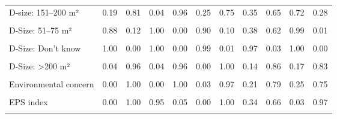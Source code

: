 \begin{table}
\begin{tabular}[t]{lrrrrrrrrrr}
D-size: 151–200 m² & 0.19 & 0.81 & 0.04 & 0.96 & 0.25 & 0.75 & 0.35 & 0.65 & 0.72 & 0.28\\
\cellcolor{gray!10}{D-Size: 26–50 m²} & \cellcolor{gray!10}{0.78} & \cellcolor{gray!10}{0.22} & \cellcolor{gray!10}{0.94} & \cellcolor{gray!10}{0.06} & \cellcolor{gray!10}{0.53} & \cellcolor{gray!10}{0.47} & \cellcolor{gray!10}{0.62} & \cellcolor{gray!10}{0.38} & \cellcolor{gray!10}{0.98} & \cellcolor{gray!10}{0.02}\\
D-Size: 51–75 m² & 0.88 & 0.12 & 1.00 & 0.00 & 0.90 & 0.10 & 0.38 & 0.62 & 0.99 & 0.01\\
\cellcolor{gray!10}{D-Size: 76–100 m²} & \cellcolor{gray!10}{0.99} & \cellcolor{gray!10}{0.01} & \cellcolor{gray!10}{0.93} & \cellcolor{gray!10}{0.07} & \cellcolor{gray!10}{0.90} & \cellcolor{gray!10}{0.10} & \cellcolor{gray!10}{0.52} & \cellcolor{gray!10}{0.48} & \cellcolor{gray!10}{0.93} & \cellcolor{gray!10}{0.07}\\
D-Size: Don't know & 1.00 & 0.00 & 1.00 & 0.00 & 0.99 & 0.01 & 0.97 & 0.03 & 1.00 & 0.00\\
\cellcolor{gray!10}{D-Size: <25 m²} & \cellcolor{gray!10}{0.96} & \cellcolor{gray!10}{0.04} & \cellcolor{gray!10}{1.00} & \cellcolor{gray!10}{0.00} & \cellcolor{gray!10}{0.94} & \cellcolor{gray!10}{0.06} & \cellcolor{gray!10}{0.20} & \cellcolor{gray!10}{0.80} & \cellcolor{gray!10}{0.92} & \cellcolor{gray!10}{0.08}\\
D-Size: >200 m² & 0.04 & 0.96 & 0.04 & 0.96 & 0.00 & 1.00 & 0.14 & 0.86 & 0.17 & 0.83\\
\cellcolor{gray!10}{D-Location: Rural} & \cellcolor{gray!10}{0.03} & \cellcolor{gray!10}{0.97} & \cellcolor{gray!10}{0.14} & \cellcolor{gray!10}{0.86} & \cellcolor{gray!10}{0.09} & \cellcolor{gray!10}{0.91} & \cellcolor{gray!10}{0.04} & \cellcolor{gray!10}{0.96} & \cellcolor{gray!10}{0.02} & \cellcolor{gray!10}{0.98}\\
Environmental concern & 0.00 & 1.00 & 0.00 & 1.00 & 0.03 & 0.97 & 0.21 & 0.79 & 0.25 & 0.75\\
\cellcolor{gray!10}{Government support} & \cellcolor{gray!10}{0.00} & \cellcolor{gray!10}{1.00} & \cellcolor{gray!10}{0.00} & \cellcolor{gray!10}{1.00} & \cellcolor{gray!10}{0.00} & \cellcolor{gray!10}{1.00} & \cellcolor{gray!10}{0.00} & \cellcolor{gray!10}{1.00} & \cellcolor{gray!10}{0.00} & \cellcolor{gray!10}{1.00}\\
EPS index & 0.00 & 1.00 & 0.95 & 0.05 & 0.00 & 1.00 & 0.34 & 0.66 & 0.03 & 0.97\\
\cellcolor{gray!10}{Income q2} & \cellcolor{gray!10}{0.43} & \cellcolor{gray!10}{0.57} & \cellcolor{gray!10}{0.61} & \cellcolor{gray!10}{0.39} & \cellcolor{gray!10}{0.21} & \cellcolor{gray!10}{0.79} & \cellcolor{gray!10}{0.78} & \cellcolor{gray!10}{0.22} & \cellcolor{gray!10}{0.53} & \cellcolor{gray!10}{0.47}\\

\end{tabular}
\end{table}
